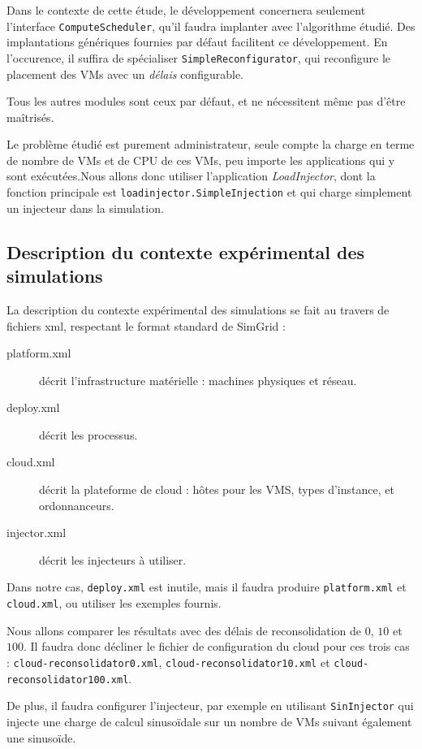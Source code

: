 \documentclass[parallelisme]{compas2017}
\begin{document}
Dans le contexte de cette étude, le développement concernera seulement 
l'interface \texttt{ComputeScheduler}, qu'il faudra implanter avec l'algorithme 
étudié. Des implantations génériques fournies par défaut facilitent ce 
développement. En l'occurence, il suffira de spécialiser 
\texttt{SimpleReconfigurator}, qui reconfigure le placement des VMs avec un 
\emph{délais} configurable.

Tous les autres modules sont ceux par défaut, et ne nécessitent même pas d'être 
maîtrisés.

Le problème étudié est purement administrateur, seule compte la charge en terme 
de nombre de VMs et de CPU de ces VMs, peu importe les applications qui y sont 
exécutées.Nous allons donc utiliser l'application \emph{LoadInjector}, dont la 
fonction principale est \texttt{loadinjector.SimpleInjection} et qui charge 
simplement un injecteur dans la simulation.

\subsection{Description du contexte expérimental des simulations}

La description du contexte expérimental des simulations se fait au travers de 
fichiers xml, respectant le format standard de SimGrid :

\begin{description}
	\item[platform.xml] décrit l'infrastructure matérielle : machines 
physiques et réseau.
	\item[deploy.xml] décrit les processus.
	\item[cloud.xml] décrit la plateforme de cloud : hôtes pour les VMS,
types d'instance, et ordonnanceurs.
	\item[injector.xml] décrit les injecteurs à utiliser.
\end{description}

Dans notre cas, \texttt{deploy.xml} est inutile, mais il faudra produire 
\texttt{platform.xml} et \texttt{cloud.xml}, ou utiliser les exemples fournis.

Nous allons comparer les résultats avec des délais de reconsolidation de $0$, 
$10$ et $100$. Il faudra donc décliner le fichier de configuration du cloud 
pour ces trois cas : \texttt{cloud-reconsolidator0.xml}, 
\texttt{cloud-reconsolidator10.xml} et \texttt{cloud-reconsolidator100.xml}. 

De plus, il faudra configurer l'injecteur, par exemple en utilisant 
\texttt{SinInjector} qui injecte une charge de calcul sinusoïdale sur un nombre 
de VMs suivant également une sinusoïde.
\end{document}
